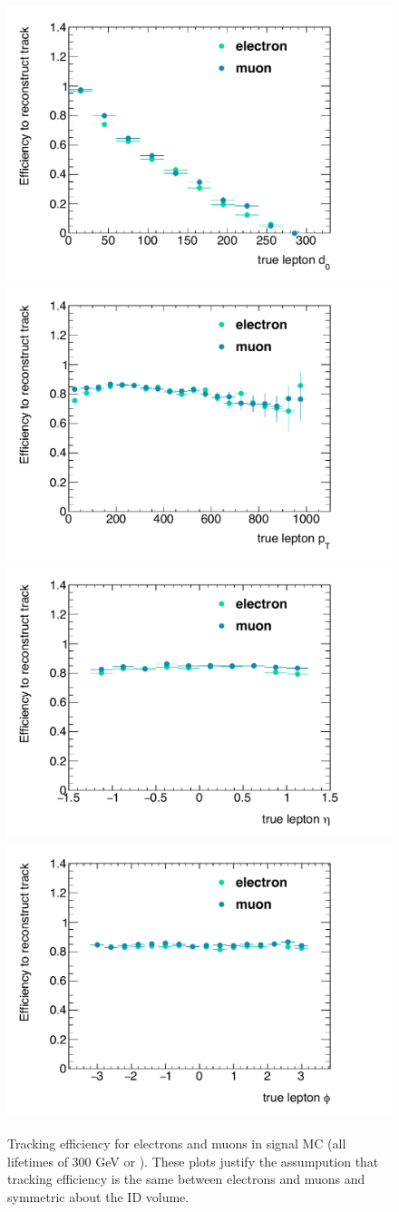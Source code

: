 \begin{figure}[htbp]
\centering
\includegraphics[width=.48\textwidth]{figures/LRT_systs/stlrt_compare_elmu_d0.pdf}
\includegraphics[width=.48\textwidth]{figures/LRT_systs/stlrt_compare_elmu_pt.pdf}
\includegraphics[width=.48\textwidth]{figures/LRT_systs/stlrt_compare_elmu_eta.pdf}
\includegraphics[width=.48\textwidth]{figures/LRT_systs/stlrt_compare_elmu_phi.pdf}
\caption{Tracking efficiency for electrons and muons in signal MC (all lifetimes of 300 GeV \selec or \smu). These plots justify the assumpution that tracking efficiency is the same between electrons and muons and symmetric about the \ac{ID} volume.}
\label{fig:trk_el_mu}
\end{figure}

